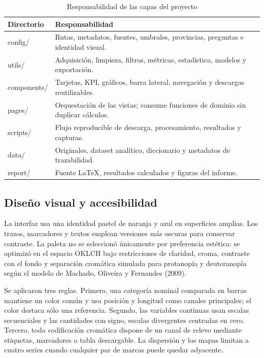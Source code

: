 \documentclass[11pt,a4paper]{article}
\begin{document}
\begin{table}[H]
\centering
\caption{Responsabilidad de las capas del proyecto}
\label{tab:arquitectura}
\small
\begin{tabularx}{\textwidth}{>{\ttfamily}p{3.0cm}X}
\toprule
Directorio & Responsabilidad \\
\midrule
config/ & Rutas, metadatos, fuentes, umbrales, provincias, preguntas e identidad visual. \\
utils/ & Adquisición, limpieza, filtros, métricas, estadística, modelos y exportación. \\
components/ & Tarjetas, KPI, gráficos, barra lateral, navegación y descargas reutilizables. \\
pages/ & Orquestación de las vistas; consume funciones de dominio sin duplicar cálculos. \\
scripts/ & Flujo reproducible de descarga, procesamiento, resultados y capturas. \\
data/ & Originales, dataset analítico, diccionario y metadatos de trazabilidad. \\
report/ & Fuente LaTeX, resultados calculados y figuras del informe. \\
\bottomrule
\end{tabularx}
\end{table}

\subsection{Diseño visual y accesibilidad}

La interfaz usa una identidad pastel de naranja y azul en superficies amplias. Los trazos,
marcadores y textos emplean versiones más oscuras para conservar contraste. La paleta no
se seleccionó únicamente por preferencia estética: se optimizó en el espacio OKLCH bajo
restricciones de claridad, croma, contraste con el fondo y separación cromática simulada
para protanopía y deuteranopía según el modelo de Machado, Oliveira y Fernandes (2009).

Se aplicaron tres reglas. Primero, una categoría nominal comparada en barras mantiene un
color común y usa posición y longitud como canales principales; el color destaca sólo una
referencia. Segundo, las variables continuas usan escalas secuenciales y las cantidades con
signo, escalas divergentes centradas en cero. Tercero, toda codificación cromática dispone
de un canal de relevo mediante etiquetas, marcadores o tabla descargable. La dispersión y
los mapas limitan a cuatro series cuando cualquier par de marcas puede quedar adyacente.
\end{document}
